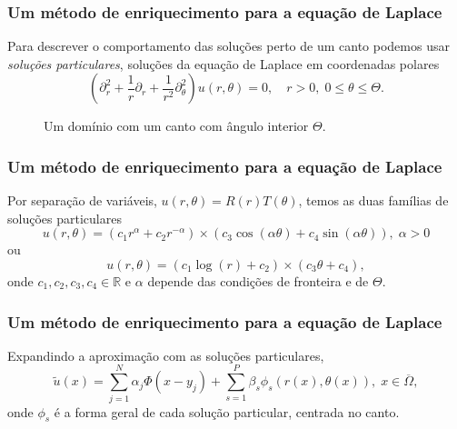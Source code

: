 \documentclass[portuguese,notheorems]{beamer}
\begin{document}
\begin{frame}\frametitle{Um método de enriquecimento para a equação de Laplace}
    Para descrever o comportamento das soluções perto de um canto podemos usar \textit{soluções particulares}, soluções da equação de Laplace em coordenadas polares
    \begin{equation}
        \left(\partial_r^2 + \frac{1}{r} \partial_r +\frac{1}{r^2}\partial_\theta^2\right)u(r,\theta) = 0, \quad r>0, \; 0 \leq \theta \leq \Theta.
    \end{equation}

    \begin{figure}[H]
    \centering
        \caption{Um domínio com um canto com ângulo interior \(\Theta\).}
    \end{figure}
\end{frame}

\begin{frame}\frametitle{Um método de enriquecimento para a equação de Laplace}
    Por separação de variáveis, \(u(r, \theta) = R(r) T(\theta)\), temos as duas famílias de soluções particulares
\[
    u(r,\theta) = \left(c_1 r^\alpha + c_2 r^{-\alpha}\right) \times \left(c_3 \cos(\alpha \theta) + c_4 \sin(\alpha \theta)\right), \; \alpha >0
\]
ou
\[
    u(r,\theta) = \left(c_1 \log (r) + c_2 \right) \times \left(c_3 \theta + c_4 \right),
\]
    onde \(c_1, c_2, c_3, c_4 \in \mathbb{R}\) e \(\alpha\) depende das condições de fronteira e de \(\Theta\).
\end{frame}

\begin{frame}\frametitle{Um método de enriquecimento para a equação de Laplace}
    Expandindo a aproximação com as soluções particulares,
    \begin{equation}
        \tilde{u}(x) = \sum_{j=1}^{N}\alpha_j \Phi(x-y_j) + \sum_{s=1}^{P} \beta_s \phi_s(r(x),\theta(x)), \; x \in \overline{\Omega},
    \end{equation}
    onde \(\phi_s\) é a forma geral de cada solução particular, centrada no canto.
\end{frame}
\end{document}
